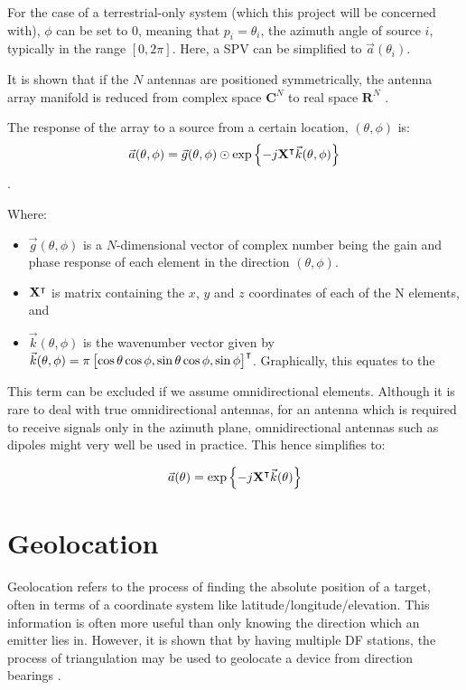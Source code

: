 For the case of a terrestrial-only system (which this project will be concerned with), \(\phi\) can be set to 0, meaning that \(p_i = \theta_i\), the azimuth angle of source \(i\), typically in the range \([0, 2\pi]\). Here, a SPV can be simplified to \(\vec{a}(\theta_i)\).

It is shown that if the \(N\) antennas are positioned symmetrically, the antenna array manifold is reduced from complex space \(\mathbf{C}^N\) to real space \(\mathbf{R}^N\) \cite{dacos1995estimating}.

The response of the array to a source from a certain location, \((\theta, \phi)\) is:
\begin{equation}
\vec{a}(\theta, \phi) = \vec{g}(\theta, \phi) \odot \exp \left\{ -j \mathbf{X}^\intercal \vec{k}(\theta,\phi) \right\}
\end{equation}
\cite{dacos1995estimating}.

Where:
\begin{itemize}
  \item \(\vec{g}(\theta, \phi)\) is a \(N\)-dimensional vector of complex number being the gain and phase response  of each element in the direction \((\theta, \phi)\). 
  \item \(\mathbf{X}^\intercal\) is matrix containing the \(x\), \(y\) and \(z\) coordinates of each of the N elements, and
\item \(\vec{k}(\theta, \phi)\) is the wavenumber vector given by \(\vec{k}(\theta, \phi) = \pi \begin{bmatrix} \cos\theta\cos\phi, \sin\theta\cos\phi, \sin\phi \end{bmatrix}^\intercal \). Graphically, this equates to the 
\end{itemize}
    

    This term can be excluded if we assume omnidirectional elements. Although it is rare to deal with true omnidirectional antennas, for an antenna which is required to receive signals only in the azimuth plane, omnidirectional antennas such as dipoles might very well be used in practice. This hence simplifies to:

\begin{equation}
\vec{a}(\theta) = \exp \left\{ -j \mathbf{X}^\intercal \vec{k}(\theta) \right\}
\end{equation}



\section{Geolocation}
Geolocation refers to the process of finding the absolute position of a target, often in terms of a coordinate system like latitude/longitude/elevation. This information is often more useful than only knowing the direction which an emitter lies in. However, it is shown that by having multiple DF stations, the process of triangulation may be used to geolocate a device from direction bearings \cite{poisel2012electronic}. 

